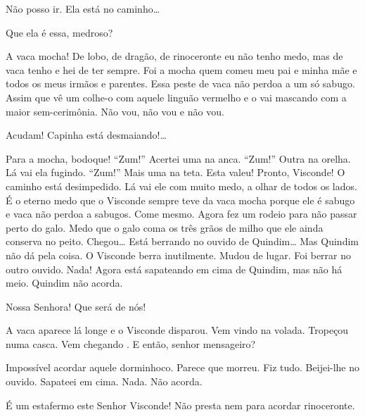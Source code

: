   Não posso ir. Ela está no caminho\ldots{}

 Que ela é essa, medroso?

 A vaca mocha! De lobo, de dragão, de rinoceronte eu não
tenho medo, mas de vaca tenho e hei de ter sempre. Foi a mocha quem
comeu meu pai e minha mãe e todos os meus irmãos e parentes. Essa peste
de vaca não perdoa a um só sabugo. Assim que vê um colhe-o com aquele
linguão vermelho e o vai mascando com a maior sem-cerimônia. Não vou,
não vou e não vou.


 Acudam! Capinha está desmaiando!\ldots{}


 Para a mocha, bodoque! ``Zum!'' Acertei uma na anca.
``Zum!'' Outra na orelha. Lá vai ela fugindo. ``Zum!'' Mais uma na teta.
Esta valeu! Pronto, Visconde! O caminho está desimpedido.  Lá vai ele com muito medo, a olhar de todos os lados. É o
eterno medo que o Visconde sempre teve da vaca mocha porque ele é sabugo
e vaca não perdoa a sabugos. Come mesmo. Agora fez um rodeio para não
passar perto do galo. Medo que o galo coma os três grãos de milho que
ele ainda conserva no peito. Chegou\ldots{} Está berrando no ouvido de
Quindim\ldots{} Mas Quindim não dá pela coisa. O Visconde berra
inutilmente. Mudou de lugar. Foi berrar no outro ouvido. Nada! Agora
está sapateando em cima de Quindim, mas não há meio. Quindim não acorda.

  Nossa Senhora! Que será de nós!

  A vaca aparece lá longe e o
Visconde disparou. Vem vindo na volada. Tropeçou numa casca. Vem
chegando . E então, senhor mensageiro?

 
Impossível acordar aquele dorminhoco. Parece que morreu. Fiz tudo.
Beijei-lhe no ouvido. Sapateei em cima. Nada. Não acorda.

 É um estafermo este Senhor Visconde! Não presta nem para
acordar rinoceronte.

